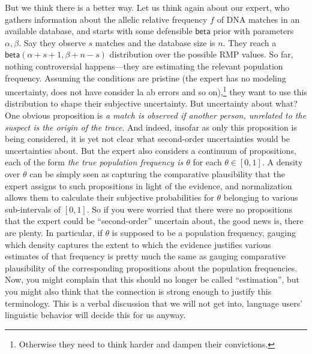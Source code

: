\documentclass[
  10pt,
  dvipsnames,enabledeprecatedfontcommands]{scrartcl}
\newcommand{\s}[1]{\mbox{$\mathsf{#1}$}}
\begin{document}
But we think there is a better way. Let us think again about our expert,
who gathers information about the allelic relative frequency \(f\) of
DNA matches in an available database, and starts with some defensible
\s{beta} prior with parameters \(\alpha, \beta\). Say they observe \(s\)
matches and the database size is \(n\). They reach a
\(\s{beta}(\alpha + s + 1 ,\beta + n - s)\) distribution over the
possible RMP values. So far, nothing controversial happens---they are
estimating the relevant population frequency. Assuming the conditions
are pristine (the expert has no modeling uncertainty, does not have
consider la ab errors and so on),\footnote{Otherwise they need to think
  harder and dampen their convictions.} they want to use this
distribution to shape their subjective uncertainty. But uncertainty
about what? One obvious proposition is
\emph{a match is observed  if another person, unrelated to the suspect is the origin of the trace}.
And indeed, insofar as only this proposition is being considered, it is
yet not clear what second-order uncertainties would be uncertainties
about. But the expert also considers a continuum of propositions, each
of the form \emph{the true population frequency is $\theta$} for each
\(\theta\in [0,1]\). A density over \(\theta\) can be simply seen as
capturing the comparative plausibility that the expert assigns to such
propositions in light of the evidence, and normalization allows them to
calculate their subjective probabilities for \(\theta\) belonging to
various sub-intervals of \([0,1]\). So if you were worried that there
were no propositions that the expert could be ``second-order'' uncertain
about, the good news is, there are plenty. In particular, if \(\theta\)
is supposed to be a population frequency, gauging which density captures
the extent to which the evidence justifies various estimates of that
frequency is pretty much the same as gauging comparative plausibility of
the corresponding propositions about the population frequencies. Now,
you might complain that this should no longer be called ``estimation'',
but you might also think that the connection is strong enough to justify
this terminology. This is a verbal discussion that we will not get into,
language users' linguistic behavior will decide this for us anyway.
\end{document}
